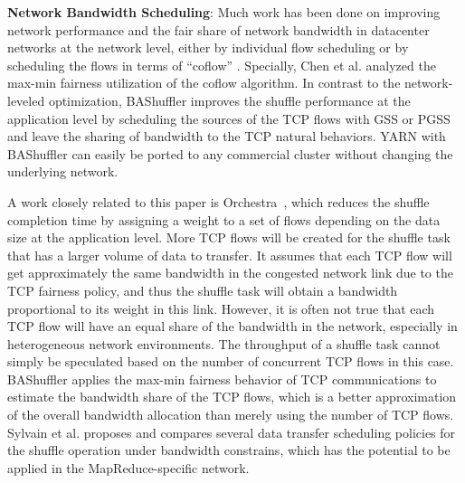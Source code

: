 \documentclass[10pt,journal,compsoc]{IEEEtran}
\begin{document}
\textbf{Network Bandwidth Scheduling}:
Much work has been done on
improving network performance and the fair share of network bandwidth
in datacenter networks at the network level, 
either by individual flow scheduling \cite{greenberg2009vl2, popa2012faircloud, shieh2011sharing,ballani2011towards} 
or by scheduling the flows in terms of ``coflow'' \cite{dogar2014decentralized, chowdhury2014efficient, Qiu:2015:MTW, chowdhury2015efficient, zhao2015rapier, chen2016coflow}. 
Specially, Chen et al. \cite{chen2016coflow} analyzed the max-min fairness utilization of the coflow algorithm. 
In contrast to the network-leveled optimization, BAShuffler improves the shuffle performance at the application
level by scheduling the sources
of the TCP flows with GSS or PGSS and leave the sharing of bandwidth
to the TCP natural behaviors.
YARN with BAShuffler can easily be ported to any commercial cluster
without changing the underlying network.


A work closely related to this paper is Orchestra~\cite{chowdhury2011managing}, which reduces the shuffle completion
time by assigning a weight to a set of flows
depending on the data size at the application level. 
More TCP flows will be created for the shuffle task that has a larger
volume of data to transfer.
It assumes that each TCP flow will get approximately the same bandwidth 
in the congested network link due to the TCP fairness policy, 
and thus the shuffle task will obtain a bandwidth proportional to
its weight in this link.
However, it is often not true that each TCP flow will have an equal share
of the bandwidth in the network,
especially in heterogeneous network environments. 
The throughput of a shuffle task cannot simply be speculated based on the
number of concurrent TCP flows in this case.
BAShuffler applies the max-min fairness behavior of TCP communications
to estimate the bandwidth share of the TCP flows,
which is a better approximation of the overall bandwidth allocation
than merely using the number of TCP flows.
Sylvain et al. \cite{gault2014dynamic} proposes and compares several data transfer scheduling policies for the shuffle operation under bandwidth constrains, 
which has the potential to be applied in the MapReduce-specific network. 

\end{document}
